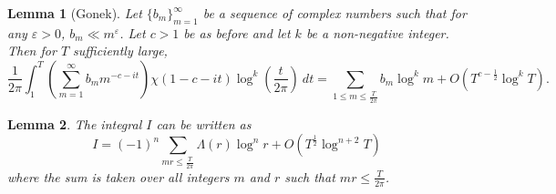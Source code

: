 \documentclass[10pt,a4paper]{amsart}
\newtheorem{lemma}{Lemma}
\begin{document}
\begin{lemma}[Gonek]\label{Gonek 5}
Let $\{b_m\}_{m=1}^{\infty}$ be a sequence of complex numbers such that for any $\varepsilon>0$, $b_m \ll m^\varepsilon$. Let $c>1$ be as before and let $k$ be a non-negative integer. Then for $T$ sufficiently large,
\[
\frac{1}{2 \pi} \int_{1}^{T} \left( \sum_{m=1}^{\infty} b_m m^{-c -it} \right) \chi (1-c-it) \log ^k \left(\frac{t}{2 \pi} \right) \ dt = \sum_{1 \leq m \leq \frac{T}{2 \pi}} b_m \log^k m + O(T^{c-\frac{1}{2}} \log ^k T).
\]
\end{lemma}

\begin{lemma}\label{Lemma 11}
The integral $I$ can be written as
\[
I= (-1)^n \sum_{m r \leq \frac{T}{2 \pi}} \Lambda(r) \log^n r + O(T^{\frac{1}{2}}\log^{n+2} T)
\]
where the sum is taken over all integers $m$ and $r$ such that $mr \leq \frac{T}{2\pi}$.
\end{lemma}
\end{document}

